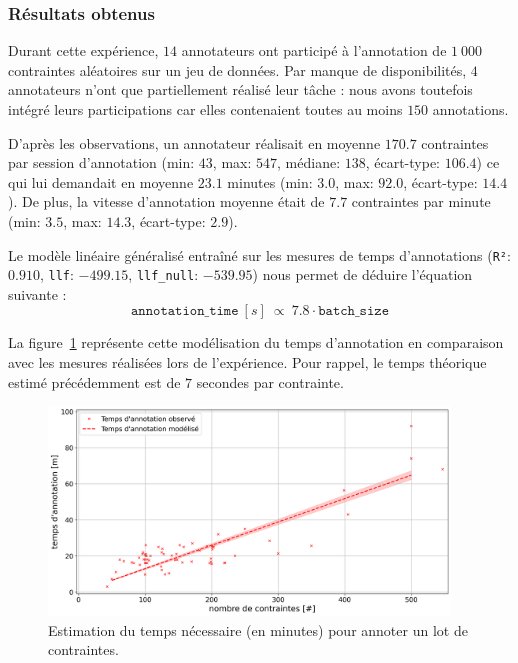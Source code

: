 		\subsubsection{Résultats obtenus}			
		
			Durant cette expérience, $14$ annotateurs ont participé à l'annotation de $1~000$ contraintes aléatoires sur un jeu de données.
			Par manque de disponibilités, $4$ annotateurs n'ont que partiellement réalisé leur tâche : nous avons toutefois intégré leurs participations car elles contenaient toutes au moins $150$ annotations.
			
			D'après les observations, un annotateur réalisait en moyenne $170.7$ contraintes par session d'annotation (min: $43$, max: $547$, médiane: $138$, écart-type: $106.4$) ce qui lui demandait en moyenne $23.1$ minutes (min: $3.0$, max: $92.0$, écart-type: $14.4$).
			De plus, la vitesse d'annotation moyenne était de $7.7$ contraintes par minute (min: $3.5$, max: $14.3$, écart-type: $2.9$).
			
			Le modèle linéaire généralisé entraîné sur les mesures de temps d'annotations (\texttt{R²}: $0.910$, \texttt{llf}: $-499.15$, \texttt{llf\_null}: $-539.95$) nous permet de déduire l'équation suivante :
			\begin{equation}
				\label{equation:4.3.1-ETUDE-COUT-COUTS-TEMPS-ANNOTATION}
				\texttt{annotation\_time}~[s]~
				\propto~7.8 \cdot \texttt{batch\_size}
			\end{equation}
		
			La figure~\ref{figure:4.3.1-ETUDE-COUTS-TEMPS-ANNOTATION-SIMULATION} représente cette modélisation du temps d'annotation en comparaison avec les mesures réalisées lors de l'expérience.
			Pour rappel, le temps théorique estimé précédemment est de $7$ secondes par contrainte.
			\begin{figure}[!htb]
				\centering
				\includegraphics[width=0.95\textwidth]{figures/etude-temps-annotation-1-modelisation-temps}
				\caption{Estimation du temps nécessaire (en minutes) pour annoter un lot de contraintes.}
				\label{figure:4.3.1-ETUDE-COUTS-TEMPS-ANNOTATION-SIMULATION}
			\end{figure}
		
